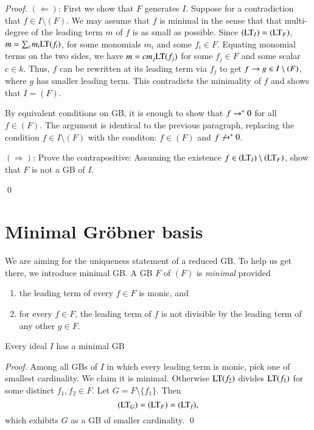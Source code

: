 \documentclass{llncs}
\begin{document}
\begin{proof}
$(\Leftarrow)$:  First we show that $F$ generates $I$.  Suppose
for a contradiction that  $f\in I\setminus (F)$.  We may assume that $f$
is minimal in the sense that that multi-degree of the leading term $m$ of $f$ is as
small as possible.  Since $({\hbox{LT}}_I) = ({\hbox{LT}}_F)$,
$m = \sum_i m_i {\hbox{LT}}(f_i)$, for some monomials $m_i$ and some $f_i\in F$.
Equating monomial terms on the two sides, we have $m = c m_j {\hbox{LT}}(f_j)$ for some
$f_j\in F$ and some scalar $c\in k$.  Thus, $f$ can be rewritten at its leading term via $f_j$ to get 
$f\rightarrow g\in I\setminus (F)$, where $g$ has smaller leading term.  This contradicts
the minimality of $f$ and shows that $I=(F)$.

By equivalent conditions on GB, it is enough to show that $f\rightarrow^* 0 $
for all $f\in (F)$.  The argument is identical to the previous paragraph, replacing
the condition $f\in I\setminus (F)$ with the conditon: $f\in (F)$ and $f\not\ras 0$.

\begin{problem}
$(\Rightarrow)$: Prove the contrapositive:  Assuming the existence 
$f\in ({\hbox{LT}}_I)\setminus ({\hbox{LT}}_F)$,
show that $F$ is not a GB of $I$.
\end{problem}
\qed
\end{proof}

\section{Minimal Gr\"obner basis}

We are aiming for the uniqueness statement of a reduced GB.  To help us get there, we introduce minimal GB.
A GB $F$ of $(F)$ is {\it minimal} provided
\begin{enumerate}
\item the leading term of every $f\in F$ is monic, and
\item for every $f\in F$, the leading term of $f$ is not divisible by the leading term 
of any other $g\in F$.
\end{enumerate}

\begin{lemma} Every ideal $I$ has a minimal GB
\end{lemma}

\begin{proof}  Among all GBs of $I$ in which every leading term is monic, 
pick one of smallest cardinality.  We claim it is minimal.  
Otherwise ${\hbox{LT}}(f_2)$ divides ${\hbox{LT}}(f_1)$ for some distinct $f_1,f_2\in F$.  Let $G=F\setminus\{f_1\}$.  Then
\[
({\hbox{LT}}_{G}) = ({\hbox{LT}}_F) = ({\hbox{LT}}_I),
\]
which exhibits $G$ as a GB of smaller cardinality.
\qed
\end{proof}
\end{document}
